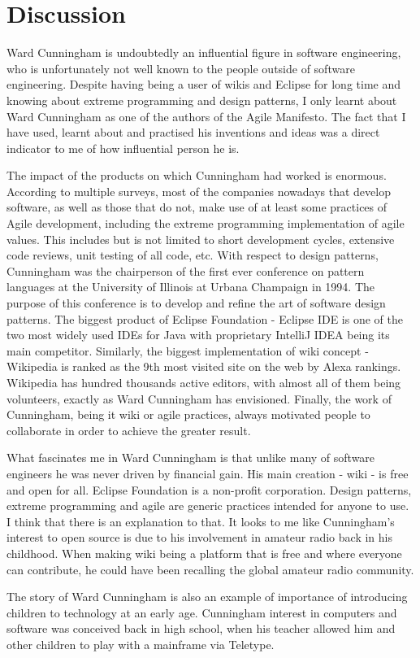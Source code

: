 \documentclass[11pt]{article}
\begin{document}
\section{Discussion}
Ward Cunningham is undoubtedly an influential figure in software engineering, who is unfortunately not well known to the people outside of software engineering. Despite having being a user of wikis and Eclipse for long time and knowing about extreme programming and design patterns, I only learnt about Ward Cunningham as one of the authors of the Agile Manifesto. The fact that I have used, learnt about and practised his inventions and ideas was a direct indicator to me of how influential person he is.
\par
The impact of the products on which Cunningham had worked is enormous. According to multiple surveys\cite{hp-agile-report}\cite{pmi-agile-report}\cite{state-of-agile-report}, most of the companies nowadays that develop software, as well as those that do not, make use of at least some practices of Agile development, including the extreme programming implementation of agile values. This includes but is not limited to short development cycles, extensive code reviews, unit testing of all code, etc.
With respect to design  patterns, Cunningham was the chairperson of the first ever conference on pattern languages at the University of Illinois at Urbana Champaign in 1994.\cite{cs-encyclopedia} The purpose of this conference is to develop and refine the art of software design patterns.
The biggest product of Eclipse Foundation - Eclipse IDE is one of the two most widely used IDEs for Java with proprietary IntelliJ IDEA being its main competitor.\cite{rebellabse-report} Similarly, the biggest implementation of wiki concept - Wikipedia is ranked as the 9th most visited site on the web by Alexa rankings. Wikipedia has hundred thousands active editors\cite{wiki-community}, with almost all of them being volunteers, exactly as Ward Cunningham has envisioned. Finally, the work of Cunningham, being it wiki or agile practices, always motivated people to collaborate in order to achieve the greater result.
\par
What fascinates me in Ward Cunningham is that unlike many of software engineers he was never driven by financial gain. His main creation - wiki - is free and open for all. Eclipse Foundation is a non-profit corporation. Design patterns, extreme programming and agile are generic practices intended for anyone to use. I think that there is an explanation to that. It looks to me like Cunningham's interest to open source is due to his involvement in amateur radio back in his childhood. When making wiki being a platform that is free and where everyone can contribute, he could have been recalling the global amateur radio community.
\par
The story of Ward Cunningham is also an example of importance of introducing children to technology at an early age. Cunningham interest in computers and software was conceived back in high school, when his teacher allowed him and other children to play with a mainframe via Teletype.
\end{document}
